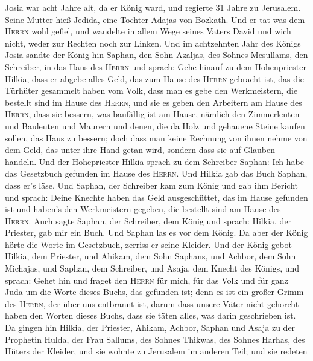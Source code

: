  Josia war acht Jahre alt, da er König ward, und regierte
31 Jahre zu Jerusalem. Seine Mutter hieß Jedida, eine Tochter Adajas von
Bozkath.  Und er tat was dem \textsc{Herrn} wohl gefiel,
und wandelte in allem Wege seines Vaters David und wich nicht, weder zur
Rechten noch zur Linken.  Und im achtzehnten Jahr des
Königs Josia sandte der König hin Saphan, den Sohn Azaljas, des Sohnes
Mesullams, den Schreiber, in das Haus des \textsc{Herrn} und sprach:
 Gehe hinauf zu dem Hohenpriester Hilkia, dass er abgebe
alles Geld, das zum Hause des \textsc{Herrn} gebracht ist, das die
Türhüter gesammelt haben vom Volk,  dass man es gebe den
Werkmeistern, die bestellt sind im Hause des \textsc{Herrn}, und sie es
geben den Arbeitern am Hause des \textsc{Herrn}, dass sie bessern, was
baufällig ist am Hause,  nämlich den Zimmerleuten und
Bauleuten und Maurern und denen, die da Holz und gehauene Steine kaufen
sollen, das Haus zu bessern;  doch dass man keine Rechnung
von ihnen nehme von dem Geld, das unter ihre Hand getan wird, sondern
dass sie auf Glauben handeln.  Und der Hohepriester Hilkia
sprach zu dem Schreiber Saphan: Ich habe das Gesetzbuch gefunden im
Hause des \textsc{Herrn}. Und Hilkia gab das Buch Saphan, dass er's
läse.  Und Saphan, der Schreiber kam zum König und gab ihm
Bericht und sprach: Deine Knechte haben das Geld ausgeschüttet, das im
Hause gefunden ist und haben's den Werkmeistern gegeben, die bestellt
sind am Hause des \textsc{Herrn}.  Auch sagte Saphan, der
Schreiber, dem König und sprach: Hilkia, der Priester, gab mir ein Buch.
Und Saphan las es vor dem König.  Da aber der König hörte
die Worte im Gesetzbuch, zerriss er seine Kleider.  Und
der König gebot Hilkia, dem Priester, und Ahikam, dem Sohn Saphans, und
Achbor, dem Sohn Michajas, und Saphan, dem Schreiber, und Asaja, dem
Knecht des Königs, und sprach:  Gehet hin und fraget den
\textsc{Herrn} für mich, für das Volk und für ganz Juda um die Worte
dieses Buchs, das gefunden ist; denn es ist ein großer Grimm des
\textsc{Herrn}, der über uns entbrannt ist, darum dass unsere Väter
nicht gehorcht haben den Worten dieses Buchs, dass sie täten alles, was
darin geschrieben ist.  Da gingen hin Hilkia, der
Priester, Ahikam, Achbor, Saphan und Asaja zu der Prophetin Hulda, der
Frau Sallums, des Sohnes Thikwas, des Sohnes Harhas, des Hüters der
Kleider, und sie wohnte zu Jerusalem im anderen Teil; und sie redeten
